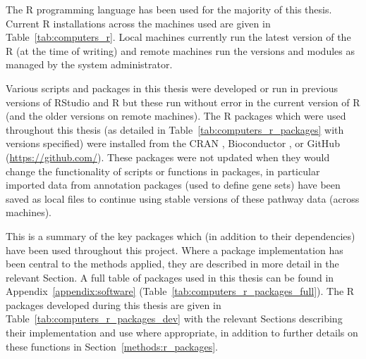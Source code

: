 The R programming language has been used for the majority of this thesis. Current R installations across the machines used are given in Table~\ref{tab:computers_r}. Local machines currently run the latest version of the R (at the time of writing) and remote machines run the versions and modules as managed by the system administrator.

Various scripts and packages in this thesis were developed or run in previous versions of RStudio and R but these run without error in the current version of R (and the older versions on remote machines). The R packages which were used throughout this thesis (as detailed in Table~\ref{tab:computers_r_packages} with versions specified) were installed from the \acrfull{CRAN} \citep{CRAN}, Bioconductor \citep[][version 3.4; BiocInstaller 1.24.0]{Gentleman2004}, or GitHub (\url{https://github.com/}). These packages were not updated when they would change the functionality of scripts or functions in packages, in particular imported data from annotation packages (used to define gene sets) have been saved as local files to continue using stable versions of these \gls{pathway} data (across machines).

This is a summary of the key packages which (in addition to their dependencies) have been used throughout this project. Where a package implementation has been central to the methods applied, they are described in more detail in the relevant Section. A full table of packages used in this thesis can be found in Appendix~\ref{appendix:software} (Table~\ref{tab:computers_r_packages_full}). The R packages developed during this thesis are given in Table~\ref{tab:computers_r_packages_dev} with the relevant Sections describing their implementation and use where appropriate, in addition to further details on these functions in Section~\ref{methods:r_packages}. 

